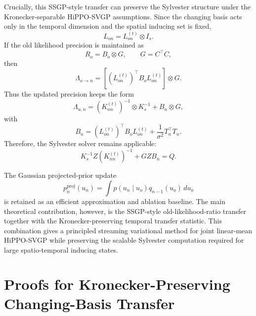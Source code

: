 \documentclass[12pt]{article}
\begin{document}
Crucially, this SSGP-style transfer can preserve the Sylvester structure under the
Kronecker-separable HiPPO-SVGP assumptions. Since the changing basis acts only in the
temporal dimension and the spatial inducing set is fixed,
\begin{equation}
    L_{on}=L_{on}^{(t)}\otimes I_s.
\end{equation}
If the old likelihood precision is maintained as
\begin{equation}
    R_o=B_o\otimes G,
    \qquad
    G=C^\top C,
\end{equation}
then
\begin{equation}
    \Lambda_{o\rightarrow n}
    =
    \left[
        \left(L_{on}^{(t)}\right)^\top
        B_o
        L_{on}^{(t)}
    \right]\otimes G.
\end{equation}
Thus the updated precision keeps the form
\begin{equation}
    \Lambda_{u,n}
    =
    \left(K_{nn}^{(t)}\right)^{-1}
    \otimes K_s^{-1}
    +
    B_n\otimes G,
\end{equation}
with
\begin{equation}
    B_n
    =
    \left(L_{on}^{(t)}\right)^\top
    B_o
    L_{on}^{(t)}
    +
    \frac{1}{\sigma^2}T_n^\top T_n.
\end{equation}
Therefore, the Sylvester solver remains applicable:
\begin{equation}
    K_s^{-1}Z
    \left(K_{nn}^{(t)}\right)^{-1}
    +
    GZB_n
    =
    Q.
\end{equation}

The Gaussian projected-prior update
\begin{equation}
    p_n^{\mathrm{proj}}(u_n)
    =
    \int
    p(u_n\mid u_o)q_{n-1}(u_o)\,du_o
\end{equation}
is retained as an efficient approximation and ablation baseline. The main theoretical
contribution, however, is the SSGP-style old-likelihood-ratio transfer together with the
Kronecker-preserving temporal transfer statistic. This combination gives a principled
streaming variational method for joint linear-mean HiPPO-SVGP while preserving the
scalable Sylvester computation required for large spatio-temporal inducing states.


\appendix

\section{Proofs for Kronecker-Preserving Changing-Basis Transfer}
\label{app:kron_preserving_transfer_proofs}
\end{document}

